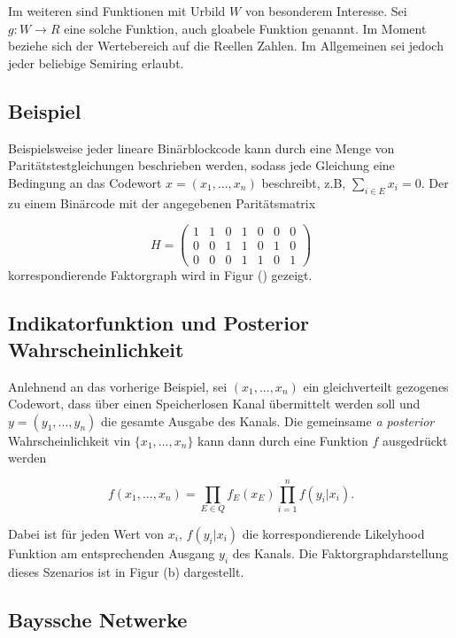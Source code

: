 \documentclass[12pt,a4paper]{scrartcl}
\numberwithin{equation}{section}
\begin{document}
Im weiteren sind Funktionen mit Urbild $W$ von besonderem Interesse. Sei $g: W \rightarrow R$ eine solche Funktion, auch gloabele
Funktion genannt. Im Moment beziehe sich der Wertebereich auf die Reellen Zahlen. Im Allgemeinen sei jedoch jeder beliebige Semiring erlaubt. \\

\subsection{Beispiel}

Beispielsweise jeder lineare Binärblockcode kann durch eine Menge von Paritätstestgleichungen beschrieben werden, sodass jede
Gleichung eine Bedingung an das Codewort $x = (x_1,...,x_n)$ beschreibt, z.B, $\sum_{i \in E} x_i = 0$. 
Der zu einem Binärcode mit der angegebenen Paritätsmatrix  

\begin{equation}
H =
  \begin{pmatrix}
  1 & 1 & 0 & 1 & 0 & 0 & 0  \\
  0 & 0 & 1 & 1 & 0 & 1 & 0  \\
  0 & 0 & 0 & 1 & 1 & 0 & 1 	
 
 \end{pmatrix}
\end{equation}
korrespondierende Faktorgraph wird in Figur () gezeigt.

\subsection{Indikatorfunktion und Posterior Wahrscheinlichkeit}

Anlehnend an das vorherige Beispiel, sei $(x_1,...,x_n)$ ein gleichverteilt gezogenes Codewort, dass über einen Speicherlosen Kanal 
übermittelt werden soll und $y = (y_1,...,y_n)$ die gesamte Ausgabe des Kanals. Die gemeinsame \textit{a posterior} Wahrscheinlichkeit
vin $\{x_1,...,x_n\}$ kann dann durch eine Funktion $f$ ausgedrückt werden

\begin{equation}
 f(x_1,...,x_n) = \prod_{E \in Q} f_E(x_E) \prod_{i=1}^n f(y_i|x_i).
\end{equation}

Dabei ist für jeden Wert von $x_i$, $f(y_i|x_i)$ die korrespondierende Likelyhood Funktion am entsprechenden Ausgang $y_i$ des Kanals.
Die Faktorgraphdarstellung dieses Szenarios ist in Figur (b) dargestellt.  

\subsection{Bayssche Netwerke}
\end{document}

